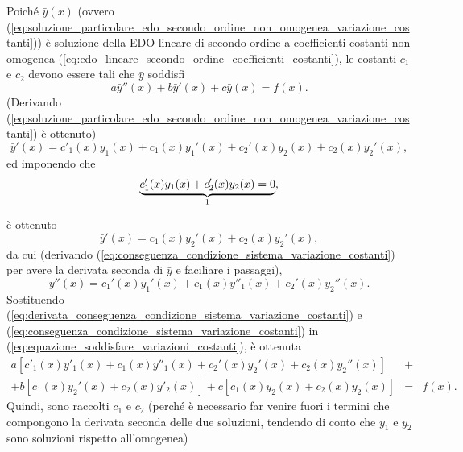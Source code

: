 \noindent Poiché $\bar y(x)$ (ovvero (\ref{eq:soluzione_particolare_edo_secondo_ordine_non_omogenea_variazione_costanti})) è soluzione della EDO lineare di secondo ordine a coefficienti costanti non omogenea (\ref{eq:edo_lineare_secondo_ordine_coefficienti_costanti}), le costanti $c_1$ e $c_2$ devono essere tali che $\bar{y}$ soddisfi
\begin{equation}\label{eq:equazione_soddisfare_variazioni_costanti}
	a\bar{y}''(x) + b\bar{y}'(x) + c\bar{y}(x) = f(x).
\end{equation}
(Derivando (\ref{eq:soluzione_particolare_edo_secondo_ordine_non_omogenea_variazione_costanti}) è ottenuto)
\begin{equation*}
	\bar{y}'(x) = c'_1(x) y_1(x) + c_1(x)y_1'(x) + c_2'(x)y_2(x) + c_2(x)y_2'(x),
\end{equation*}
ed imponendo che
\begin{equation}\label{eq:condizione_sistema_risoluzione_edo_lineare_secondo_ordine_non_omogonea_variazione}
	\underbrace{c_1'(x)y_1(x) + c_2'(x) y_2(x) = 0}_{\footnotemark},
\end{equation}
è ottenuto
\begin{equation}\label{eq:conseguenza_condizione_sistema_variazione_costanti}
	\bar{y}'(x) = c_1(x) y_2'(x) + c_2(x) y_2'(x),
\end{equation}
da cui (derivando (\ref{eq:conseguenza_condizione_sistema_variazione_costanti}) per avere la derivata seconda di $\bar{y}$ e faciliare i passaggi),
\begin{equation}\label{eq:derivata_conseguenza_condizione_sistema_variazione_costanti}
	\bar{y}''(x) = c_1'(x) y_1'(x) + c_1(x)y''_1(x) + c_2'(x)y_2''(x).
\end{equation}
Sostituendo (\ref{eq:derivata_conseguenza_condizione_sistema_variazione_costanti}) e (\ref{eq:conseguenza_condizione_sistema_variazione_costanti}) in (\ref{eq:equazione_soddisfare_variazioni_costanti}), è ottenuta
\begin{equation}\label{eq:punto_inizio_trucco}
	\begin{matrix}
		a[c'_1(x)y'_1(x) + c_1(x) y''_1(x) + c_2'(x) y_2'(x) + c_2(x) y_2''(x)] &+&\\
		+ b[c_1(x) y_2'(x) + c_2(x)y'_2(x)] + c[c_1(x)y_2(x) + c_2(x)y_2(x)] &=& f(x).
	\end{matrix}
\end{equation}
Quindi, sono raccolti $c_1$ e $c_2$ (perché è necessario far venire fuori i termini che compongono la derivata seconda delle due soluzioni, tendendo di conto che $y_1$ e $y_2$ sono soluzioni rispetto all'omogenea)

